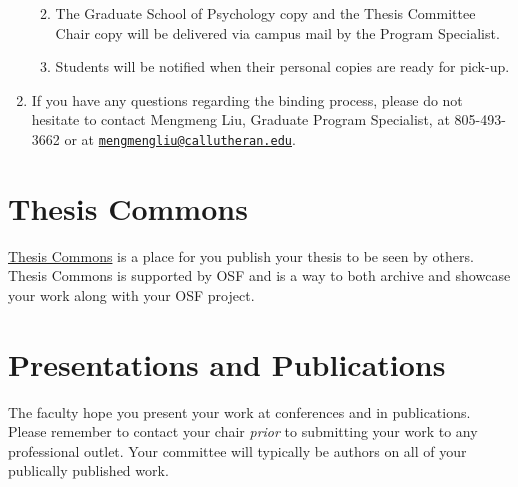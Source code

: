 \documentclass[openany]{book}
\providecommand{\tightlist}{%
  \setlength{\itemsep}{0pt}\setlength{\parskip}{0pt}}
\begin{document}
\begin{enumerate}
  \begin{enumerate}
  \def\labelenumii{\alph{enumii}.}
  \tightlist
  \item
    The Graduate School of Psychology copy and the Thesis Committee Chair copy will be delivered via campus mail by the Program Specialist.
  \item
    Students will be notified when their personal copies are ready for pick-up.
  \end{enumerate}
\item
  If you have any questions regarding the binding process, please do not hesitate to contact Mengmeng Liu, Graduate Program Specialist, at 805-493-3662 or at \href{mailto:mengmengliu@callutheran.edu}{\nolinkurl{mengmengliu@callutheran.edu}}.
\end{enumerate}

\hypertarget{thesis-commons}{%
\chapter{Thesis Commons}\label{thesis-commons}}

\href{https://thesiscommons.org/}{Thesis Commons} is a place for you publish your thesis to be seen by others. Thesis Commons is supported by OSF and is a way to both archive and showcase your work along with your OSF project.

\hypertarget{presentations-and-publications}{%
\chapter{Presentations and Publications}\label{presentations-and-publications}}

The faculty hope you present your work at conferences and in publications. Please remember to contact your chair \emph{prior} to submitting your work to any professional outlet. Your committee will typically be authors on all of your publically published work.


\end{document}
